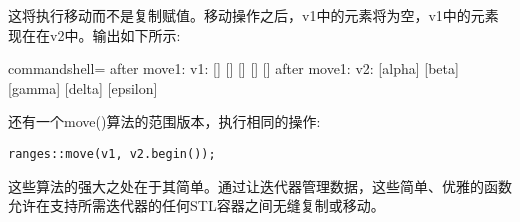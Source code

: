 这将执行移动而不是复制赋值。移动操作之后，v1中的元素将为空，v1中的元素现在在v2中。输出如下所示:

\begin{tcblisting}{commandshell={}}
after move1: v1: [] [] [] [] []
after move1: v2: [alpha] [beta] [gamma] [delta] [epsilon]
\end{tcblisting}

还有一个move()算法的范围版本，执行相同的操作:

\begin{lstlisting}[style=styleCXX]
ranges::move(v1, v2.begin());
\end{lstlisting}

这些算法的强大之处在于其简单。通过让迭代器管理数据，这些简单、优雅的函数允许在支持所需迭代器的任何STL容器之间无缝复制或移动。








